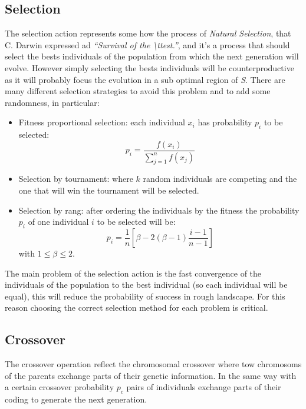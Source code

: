 \documentclass{article}
\newcommand{\tmem}[1]{{\em #1\/}}
\begin{document}
\subsection{Selection}

The selection action represents some how the process of {\tmem{Natural
Selection}}, that C. Darwin expressed ad {\tmem{``Survival of the
\textbackslash ttest.''}}, and it's a process that should select the bests
individuals of the population from which the next generation will evolve.
However simply selecting the bests individuals will be counterproductive as it
will probably focus the evolution in a sub optimal region of {\tmem{S}}. There
are many different selection strategies to avoid this problem and to add some
randomness, in particular:
\begin{itemize}
  \item Fitness proportional selection: each individual $x_i$ has probability
  $p_i$ to be selected:
  \[ p_i = \frac{f (x_i)}{\sum_{j = 1}^n f (x_j)} \]
  \item Selection by tournament: where $k$ random individuals are competing
  and the one that will win the tournament will be selected.
  
  \item Selection by rang: after ordering the individuals by the fitness the
  probability $p_i$ of one individual $i$ to be selected will be:
  \[ p_i = \frac{1}{n} \left[ \beta - 2 (\beta - 1) \frac{i - 1}{n - 1}
     \right] \]
  with $1 \leqslant \beta \leqslant 2$.
\end{itemize}
The main problem of the selection action is the fast convergence of the
individuals of the population to the best individual (so each individual will
be equal), this will reduce the probability of success in rough landscape. For
this reason choosing the correct selection method for each problem is
critical.

\subsection{Crossover}

The crossover operation reflect the chromosomal crossover where tow chromosoms
of the parents exchange parts of their genetic information. In the same way
with a certain crossover probability $p_c$ pairs of individuals exchange parts
of their coding to generate the next generation.
\end{document}
